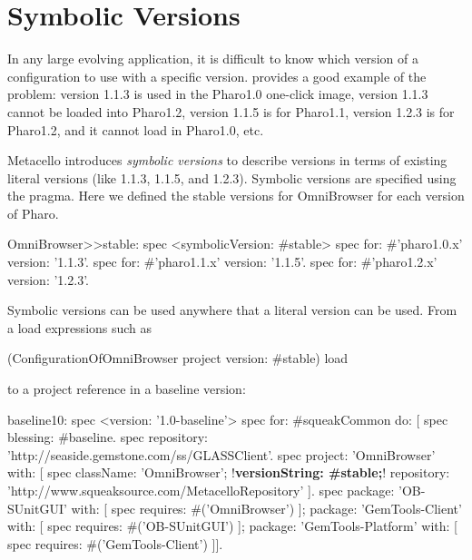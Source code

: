 \documentclass[a4paper,10pt,twoside]{book}
\begin{document}
\section{Symbolic Versions}
In any large evolving application, it is difficult to know which version of a configuration to use with a specific version. 
 provides a good example of the problem: version 1.1.3 is used in the Pharo1.0 one-click image,  version 1.1.3 cannot be loaded into Pharo1.2, version 1.1.5 is for Pharo1.1, version 1.2.3 is for Pharo1.2, and it cannot load in Pharo1.0, etc. 

Metacello introduces \emph{symbolic versions} to describe versions in terms of existing literal versions (like 1.1.3, 1.1.5, and 1.2.3). Symbolic versions are specified using the  pragma. Here we defined the stable versions for OmniBrowser for each version of Pharo.

\begin{code}{}
OmniBrowser>>stable: spec
     <symbolicVersion: #stable>
     spec for: #'pharo1.0.x' version: '1.1.3'.
     spec for: #'pharo1.1.x' version: '1.1.5'.
     spec for: #'pharo1.2.x' version: '1.2.3'.
\end{code}

Symbolic versions can be used anywhere that a literal version can be used. From a load expressions such as 

\begin{code}{}
(ConfigurationOfOmniBrowser project version: #stable) load
\end{code}

to a project reference in a baseline version:

\begin{code}{}
baseline10: spec
     <version: '1.0-baseline'>
     spec for: #squeakCommon do: [
          spec blessing: #baseline.
          spec repository: 'http://seaside.gemstone.com/ss/GLASSClient'.
     spec
          project: 'OmniBrowser' with: [
          spec
               className: 'OmniBrowser';
               !\textbf{versionString: \#stable;}!
               repository: 'http://www.squeaksource.com/MetacelloRepository' ].
     spec
         package: 'OB-SUnitGUI' with: [
               spec requires: #('OmniBrowser') ];
         package: 'GemTools-Client' with: [
               spec requires: #('OB-SUnitGUI') ];
         package: 'GemTools-Platform' with: [
               spec requires: #('GemTools-Client') ]].
\end{code}
\end{document}

